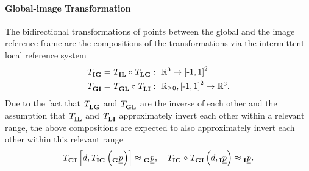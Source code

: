 \paragraph*{Global-image Transformation} $\ $\\
The bidirectional transformations of points between the global and the image reference frame
are the compositions of the transformations via the intermittent local reference system
\begin{align} \label{eq:global_image_transformations}
    \trafo[]{}{\irs\grs}{}{}
    &=
    \trafo[]{}{\irs\lrs}{}{} \circ \trafo[]{}{\lrs\grs}{}{}
    :\ 
    \mathbb{R}^3 \rightarrow \left[\text{-} 1, 1\right]^2 
    \nonumber \\
    \trafo[]{}{\grs\irs}{}{}
    &=
    \trafo[]{}{\grs\lrs}{}{} \circ \trafo[]{}{\lrs\irs}{}{}
    :\ 
    \mathbb{R}_{\ge 0}, \left[\text{-} 1, 1\right]^2 \rightarrow \mathbb{R}^3.
\end{align}
Due to the fact that
$\trafo[]{}{\lrs\grs}{}{}$
and
$\trafo[]{}{\grs\lrs}{}{}$
are the inverse of each other
and the assumption that
$\trafo[]{}{\irs\lrs}{}{}$
and
$\trafo[]{}{\lrs\irs}{}{}$
approximately invert each other within a relevant range,
the above compositions are expected to also approximately invert each other within this relevant range
\begin{equation}
    \trafo[]{}{\grs\irs}{}{} \left[
        d, \trafo[]{}{\irs\grs}{}{} \left( \pos[]{}{}{\grs}{} \right)
    \right]
    \approx
    \pos[]{}{}{\grs}{}
    ,\quad
    \trafo[]{}{\irs\grs}{}{}
    \circ 
    \trafo[]{}{\grs\irs}{}{} \left(
        d, \pos[]{}{}{\irs}{}
    \right)
    \approx
    \pos[]{}{}{\irs}{}.
\end{equation}

